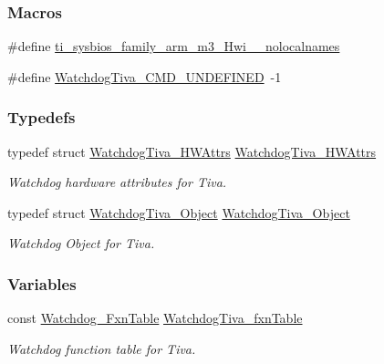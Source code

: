 \subsubsection*{Macros}
\begin{DoxyCompactItemize}
\item 
\#define \hyperlink{_watchdog_tiva_8h_aaa17ecf48f5762e2e1bdb0bab8aacf0c}{ti\-\_\-sysbios\-\_\-family\-\_\-arm\-\_\-m3\-\_\-\-Hwi\-\_\-\-\_\-nolocalnames}
\item 
\#define \hyperlink{_watchdog_tiva_8h_ad3fa921c569ea10e6ef0400df531ae1a}{Watchdog\-Tiva\-\_\-\-C\-M\-D\-\_\-\-U\-N\-D\-E\-F\-I\-N\-E\-D}~-\/1
\end{DoxyCompactItemize}
\subsubsection*{Typedefs}
\begin{DoxyCompactItemize}
\item 
typedef struct \hyperlink{struct_watchdog_tiva___h_w_attrs}{Watchdog\-Tiva\-\_\-\-H\-W\-Attrs} \hyperlink{_watchdog_tiva_8h_a7f1c7128705fb9a8435812e14f103fc1}{Watchdog\-Tiva\-\_\-\-H\-W\-Attrs}
\begin{DoxyCompactList}\small\item\em Watchdog hardware attributes for Tiva. \end{DoxyCompactList}\item 
typedef struct \hyperlink{struct_watchdog_tiva___object}{Watchdog\-Tiva\-\_\-\-Object} \hyperlink{_watchdog_tiva_8h_a59414cac1ebd2580c3475ac6d7f24342}{Watchdog\-Tiva\-\_\-\-Object}
\begin{DoxyCompactList}\small\item\em Watchdog Object for Tiva. \end{DoxyCompactList}\end{DoxyCompactItemize}
\subsubsection*{Variables}
\begin{DoxyCompactItemize}
\item 
const \hyperlink{struct_watchdog___fxn_table}{Watchdog\-\_\-\-Fxn\-Table} \hyperlink{_watchdog_tiva_8h_ae03e6ed51cc78abdf88691959865c2e2}{Watchdog\-Tiva\-\_\-fxn\-Table}
\begin{DoxyCompactList}\small\item\em Watchdog function table for Tiva. \end{DoxyCompactList}\end{DoxyCompactItemize}


